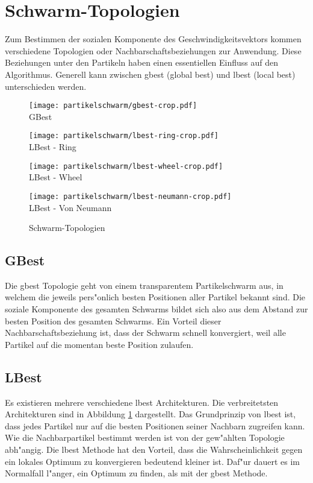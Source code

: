 \section{Schwarm-Topologien}
Zum Bestimmen der sozialen Komponente des Geschwindigkeitsvektors
kommen verschiedene Topologien oder Nachbarschaftsbeziehungen zur
Anwendung. Diese Beziehungen unter den Partikeln haben einen essentiellen
Einfluss auf den Algorithmus. Generell kann zwischen gbest (global best)
und lbest (local best) unterschieden werden.

\begin{figure}[htbp]
	\centering
	\begin{minipage}{4cm}
		\centering
		\texttt{[image: partikelschwarm/gbest-crop.pdf]}\\
		GBest
	\end{minipage}
	\begin{minipage}{4cm}
		\centering
		\texttt{[image: partikelschwarm/lbest-ring-crop.pdf]}\\
		LBest - Ring
	\end{minipage}
	\begin{minipage}{4cm}
		\centering
		\texttt{[image: partikelschwarm/lbest-wheel-crop.pdf]}\\
		LBest - Wheel
	\end{minipage}
	\begin{minipage}{4cm}
		\centering
		\texttt{[image: partikelschwarm/lbest-neumann-crop.pdf]}\\
		LBest - Von Neumann
	\end{minipage}
	\caption{Schwarm-Topologien}
	\label{schwarm-topologien}
\end{figure}

\subsection{GBest}
Die gbest Topologie geht von einem transparentem Partikelschwarm aus,
in welchem die jeweils pers"onlich besten Positionen aller Partikel
bekannt sind. Die soziale Komponente des gesamten Schwarms bildet sich
also aus dem Abstand zur besten Position des gesamten Schwarms. Ein
Vorteil dieser Nachbarschaftsbeziehung ist, dass der Schwarm schnell
konvergiert, weil alle Partikel auf die momentan beste Position zulaufen.

\subsection{LBest}
Es existieren mehrere verschiedene lbest Architekturen. Die verbreitetsten
Architekturen sind in Abbildung \ref{schwarm-topologien} dargestellt. Das
Grundprinzip von lbest ist, dass jedes Partikel nur auf die besten
Positionen seiner Nachbarn zugreifen kann. Wie die Nachbarpartikel
bestimmt werden ist von der gew"ahlten Topologie abh"angig. Die lbest
Methode hat den Vorteil, dass die Wahrscheinlichkeit gegen ein lokales
Optimum zu konvergieren bedeutend kleiner ist. Daf"ur dauert es im
Normalfall l"anger, ein Optimum zu finden, als mit der gbest Methode.


